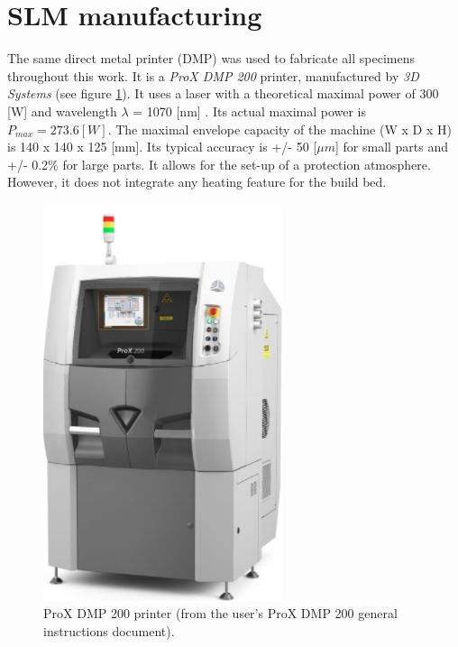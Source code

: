 \section{SLM manufacturing}
\label{MMFPP}
The same direct metal printer (DMP) was used to fabricate all specimens throughout this work. It is a \textit{ProX DMP 200} printer, manufactured by \textit{3D Systems} (see figure \ref{fig:Printer}). It uses a laser with a theoretical maximal power of 300 [W] and wavelength $\lambda$ = 1070 [nm] \parencite{3D}. Its actual maximal power is $P_{max}=273.6 [W]$. The maximal envelope capacity of the machine (W x D x H) is 140 x 140 x 125 [mm]. Its typical accuracy is +/- 50 [$\mu m$] for small parts and +/- 0.2\% for large parts. It allows for the set-up of a protection atmosphere. However, it does not integrate any heating feature for the build bed.\\

\begin{figure}[ht]
\centering
\includegraphics[scale=0.7]{Images/Printer}
\decoRule
\caption[ProX DMP 200 printer]{ProX DMP 200 printer (from the user's ProX DMP 200 general instructions document).}
\label{fig:Printer}
\end{figure}

